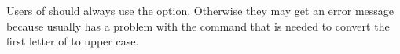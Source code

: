 Users of  should always use the  option.
Otherwise they may get an error message because  usually has
a problem with the  command that
is needed to convert the first letter of  to upper case.%
\EndIndexGroup
%
\EndIndexGroup
%
\endinput



